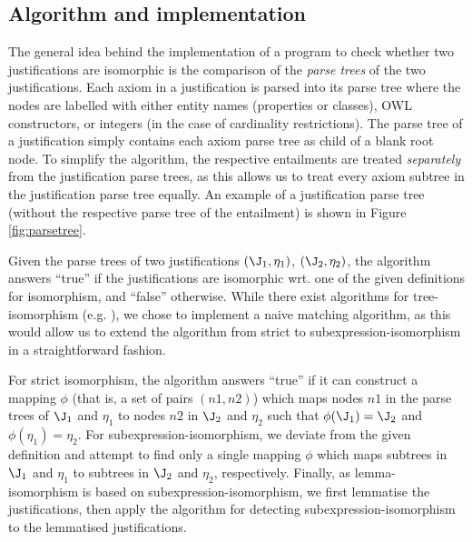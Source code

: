 \subsection{Algorithm and implementation}

The general idea behind the implementation of a program to check whether two justifications are isomorphic is the comparison of the \emph{parse trees} of the two justifications. Each axiom in a  justification is parsed into its parse tree where the nodes are labelled with either entity names (properties or classes), OWL constructors, or integers (in the case of cardinality restrictions). The parse tree of a justification simply contains each axiom parse tree as child of a blank root node. To simplify the algorithm, the respective entailments are treated \emph{separately} from the justification parse trees, as this allows us to treat every axiom subtree in the justification parse tree equally. An example of a justification parse tree (without the respective parse tree of the entailment) is shown in Figure \ref{fig:parsetree}. 


\begin{figure}
\end{figure}

Given the parse trees of two justifications $(\J_{1}, \eta_{1})$,  $(\J_{2}, \eta_{2})$, the algorithm answers \enquote{true} if the justifications are isomorphic wrt. one of the given definitions for isomorphism, and \enquote{false} otherwise. While there exist algorithms for tree-isomorphism (e.g. \cite{shamir99aa}), we chose to implement a naive matching algorithm, as this would allow us to extend the algorithm from strict to subexpression-isomorphism in a straightforward fashion.

For strict isomorphism, the algorithm answers \enquote{true} if it can construct a mapping $\phi$ (that is, a set of pairs $(n1, n2)$) which maps nodes $n1$ in the parse trees of $\J_{1}$ and $\eta_{1}$ to nodes $n2$ in $\J_{2}$ and $\eta_{2}$ such that $\phi(\J_{1}) = \J_{2}$ and $\phi(\eta_{1}) = \eta_{2}$. For subexpression-isomorphism, we deviate from the given definition and attempt to find only a single mapping $\phi$ which maps subtrees in $\J_{1} $ and $\eta_{1}$ to subtrees in $\J_{2}$ and $\eta_{2}$, respectively. Finally, as lemma-isomorphism is based on subexpression-isomorphism, we first lemmatise the justifications, then apply the algorithm for detecting subexpression-isomorphism to the lemmatised justifications.

